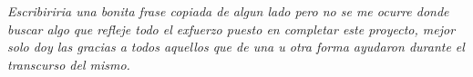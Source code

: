 

\vspace*{\fill}
\begin{changemargin}{5cm}{0.1cm}
{\sf \large \em \raggedleft
Escribiriria una bonita frase copiada de algun lado pero no se me ocurre
donde buscar algo que refleje todo el exfuerzo puesto en completar este
proyecto, mejor solo doy las gracias a todos aquellos que de una u otra forma
ayudaron durante el transcurso del mismo.
}
\end{changemargin}
\vspace*{\fill}


\newpage





